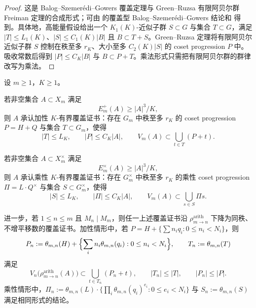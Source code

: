 \begin{proof}
这是 Balog--Szemerédi--Gowers 覆盖定理与 Green--Ruzsa 有限阿贝尔群 Freiman 定理的合成形式；可由 \cite[Theorem~2.29]{TaoVu2006} 的覆盖型 Balog--Szemerédi--Gowers 结论和 \cite[Theorem~1.2]{GreenRuzsa2007} 得到。具体地，高能量假设给出一个 \(K_1(K)\)-近似子群 \(S\subset G\) 与集合 \(T\subset G\)，满足 \(|T|\le L_1(K)\)、\(|S|\le C_1(K)|B|\) 且 \(B\subset T+S\)。Green--Ruzsa 定理将有限阿贝尔近似子群 \(S\) 控制在秩至多 \(r_K\)、大小至多 \(C_2(K)|S|\) 的 coset progression \(P\) 中。吸收常数后得到 \(|P|\le C_K|B|\) 与 \(B\subset P+T\)。乘法形式只需把有限阿贝尔群的群律改写为乘法。
\end{proof}

\begin{theorem}[稳定碰撞统计的有界进展模型]\label{distill:breuillard_green_tao_approximate_groups_and_helfgott_growth-arithmetic_coincidence_to_model_theorem-stable-collision-controlled-progression-model}
设 \(m\ge 1\)，\(K\ge 1\)。

若非空集合 \(A\subset X_m\) 满足
\[
E_m^+(A)\ge |A|^3/K,
\]
则 \(A\) 承认加性 \(K\)-有界覆盖证书：存在 \(G_m\) 中秩至多 \(r_K\) 的 coset progression \(P=H+Q\) 与集合 \(T\subset G_m\)，使得
\[
|T|\le L_K,\qquad |P|\le C_K|A|,\qquad
V_m(A)\subset \bigcup_{t\in T}(P+t).
\]

若非空集合 \(A\subset X_m^\times\) 满足
\[
E_m^\times(A)\ge |A|^3/K,
\]
则 \(A\) 承认乘性 \(K\)-有界覆盖证书：存在 \(G_m^\times\) 中秩至多 \(r_K\) 的乘性 coset progression \(\Pi=L\cdot Q^\times\) 与集合 \(S\subset G_m^\times\)，使得
\[
|S|\le L_K,\qquad |\Pi|\le C_K|A|,\qquad
V_m(A)\subset \bigcup_{s\in S}\Pi s.
\]

进一步，若 \(1\le n\le m\) 且 \(M_n\mid M_m\)，则任一上述覆盖证书沿 \(\rho^{\mathrm{arith}}_{m\to n}\) 下降为同秩、不增平移数的覆盖证书。加性情形中，若 \(P=H+\{\sum n_iq_i:0\le n_i<N_i\}\)，则
\[
P_n:=\theta_{m,n}(H)+\Bigl\{\sum_i n_i\theta_{m,n}(q_i):0\le n_i<N_i\Bigr\},\qquad
T_n:=\theta_{m,n}(T)
\]
满足
\[
V_n\bigl(\rho^{\mathrm{arith}}_{m\to n}(A)\bigr)\subset
\bigcup_{t\in T_n}(P_n+t),\qquad
|T_n|\le |T|,\qquad |P_n|\le |P|.
\]
乘性情形中，\(\Pi_n:=\theta_{m,n}(L)\cdot\{\prod_i\theta_{m,n}(q_i)^{e_i}:0\le e_i<N_i\}\) 与 \(S_n:=\theta_{m,n}(S)\) 满足相同形式的结论。
\end{theorem}

